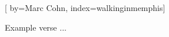 
[%
    by={Marc Cohn},
    index={walkinginmemphis}]


    \label{walkinginmemphis}

    \beginverse
        Example verse ...
    \endverse
\endsong
